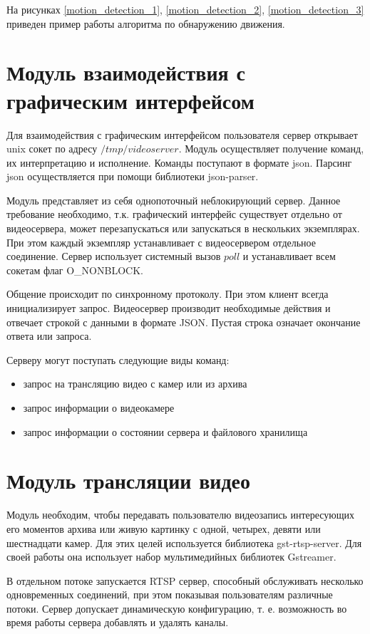 На рисунках \ref{motion_detection_1}, \ref{motion_detection_2}, \ref{motion_detection_3}
приведен пример работы алгоритма по обнаружению движения.

\section{Модуль взаимодействия с графическим интерфейсом}
Для взаимодействия с графическим интерфейсом пользователя сервер открывает unix сокет
по адресу $/tmp/videoserver$. Модуль осуществляет получение команд, их интерпретацию и исполнение.
Команды поступают в формате json. Парсинг json осуществляется при помощи библиотеки json-parser.

Модуль представляет из себя однопоточный неблокирующий сервер. Данное требование необходимо, т.к.
графический интерфейс существует отдельно от видеосервера, может перезапускаться или запускаться в
нескольких экземплярах. При этом каждый экземпляр устанавливает с видеосервером отдельное соединение.
Сервер использует системный вызов $poll$ и устанавливает всем сокетам флаг O\_NONBLOCK.

Общение происходит по синхронному протоколу. При этом клиент всегда инициализирует запрос.
Видеосервер производит необходимые действия и отвечает строкой с данными в формате JSON.
Пустая строка означает окончание ответа или запроса.

Серверу могут поступать следующие виды команд:
\smallskip
\begin{itemize}
	\item запрос на трансляцию видео с камер или из архива
	\item запрос информации о видеокамере
	\item запрос информации о состоянии сервера и файлового хранилища
\end{itemize}

\section{Модуль трансляции видео}
Модуль необходим, чтобы передавать пользователю видеозапись интересующих его моментов архива или
живую картинку с одной, четырех, девяти или шестнадцати камер.
Для этих целей используется библиотека gst-rtsp-server. Для своей работы она использует набор
мультимедийных библиотек Gstreamer.

В отдельном потоке запускается RTSP сервер, способный обслуживать несколько одновременных соединений,
при этом показывая пользователям различные потоки.
Сервер допускает динамическую конфигурацию, т. е. возможность во время работы сервера добавлять
и удалять каналы.

